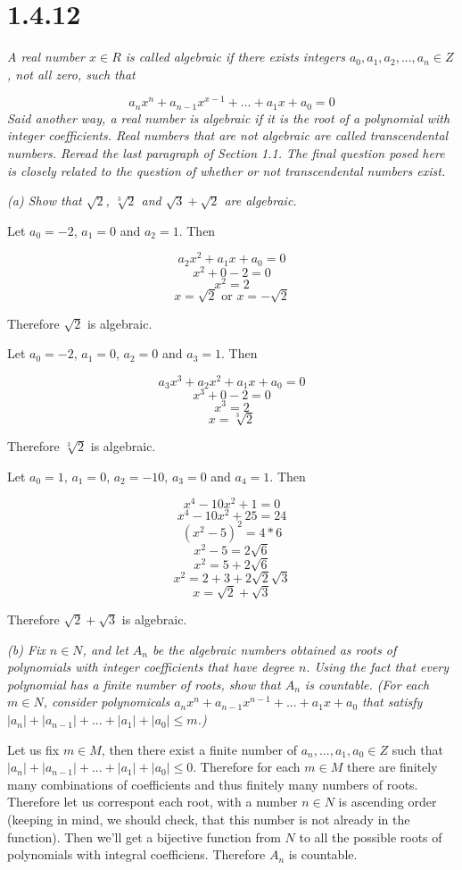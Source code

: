 \documentclass[11pt,oneside,titlepage]{article}
\begin{document}
\section*{1.4.12}
\textit{A real number $x \in R$ is called algebraic if there exists integers
  $a_0, a_1, a_2, ..., a_n \in Z$, not all zero, such that }

$$a_n x^n + a_{n - 1} x^{x - 1} + ... + a_1 x + a_0 = 0$$
\textit{Said another way, a real number is algebraic if it is the root of a polynomial
  with integer coefficients. Real numbers that are not algebraic are called transcendental
  numbers. Reread the last paragraph of Section 1.1. The final question posed here is
  closely related to the question of whether or not transcendental numbers exist.}

\textit{(a) Show that $\sqrt{2}$, $\sqrt[3]{2}$ and $\sqrt{3} + \sqrt{2}$ are algebraic.}

Let $a_0 = -2$, $a_1 = 0$ and $a_2 = 1$. Then

$$a_2 x^2 + a_1 x + a_0 = 0$$
$$ x^2 + 0  - 2 = 0$$
$$x^2 = 2$$
$$x = \sqrt{2} \text{ or } x = -\sqrt{2}$$

Therefore $\sqrt{2}$ is algebraic.

Let $a_0 = -2$, $a_1 = 0$, $a_2 = 0$ and $a_3 = 1$. Then

$$a_3 x^3 + a_2 x^2 + a_1 x + a_0 = 0$$
$$ x^3 + 0  - 2 = 0$$
$$x^3 = 2$$
$$x = \sqrt[3]{2}$$

Therefore $\sqrt[3]{2}$ is algebraic.

Let $a_0 = 1$, $a_1 = 0$, $a_2 = -10$, $a_3 = 0$ and $a_4 = 1$. Then

$$x^4 - 10 x^2 + 1 = 0$$
$$x^4 - 10 x^2 + 25 =  24$$
$$(x^2 - 5)^2 =  4 * 6$$
$$x^2 - 5 =  2\sqrt{6}$$
$$x^2 = 5 + 2\sqrt{6}$$
$$x^2 = 2 + 3 + 2\sqrt{2}\sqrt{3}$$
$$x = \sqrt{2} + \sqrt{3}$$

Therefore $\sqrt{2} + \sqrt{3}$ is algebraic.

\textit{(b) Fix $n \in N$, and let $A_n$ be the algebraic numbers obtained as roots of
  polynomials with integer coefficients that have degree $n$. Using the fact that
  every polynomial has a finite number of roots, show that $A_n$ is countable. (For
  each $m \in N$, consider polynomicals $a_n x^n + a_{n - 1} x^{n - 1} + ... +
  a_1 x + a_0$ that satisfy $|a_n| + |a_{n - 1}| + ... + |a_1| + |a_0| \leq m$.)}

Let us fix $m \in M$, then there exist a finite number of $a_n, ..., a_1, a_0 \in Z$ such that
$|a_n| + |a_{n - 1}| + ... + |a_1| + |a_0| \leq 0$. Therefore for each $m \in M$ there
are finitely many combinations of coefficients and thus finitely many numbers of roots.
Therefore let us correspont each root, with a number $n \in N$ is ascending order
(keeping in mind, we should check, that this number is not already in the function). Then
we'll get a bijective  function from $N$ to all the possible roots of polynomials
with integral coefficiens. Therefore $A_n$ is countable.
\end{document}
